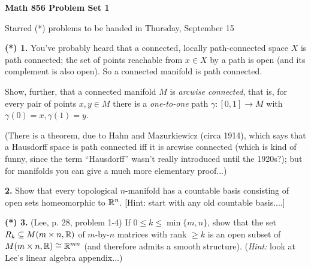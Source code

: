
\nopagenumbers


\loadmsbm

\def\ctln{\centerline}
\def\ssk{\smallskip}
\def\msk{\medskip}
\def\bsk{\bigskip}
\def\nidt{\noindent}
\def\del{\partial}
\def\bbr{{\Bbb R}}
\def\cla{{\Cal A}}
\def\clb{{\Cal B}}
\def\clc{{\Cal C}}



\ctln{\bf Math 856 Problem Set 1}

\ssk

\ctln{Starred (*) problems to be handed in Thursday, September 15}

\bsk

\item{\bf (*) 1.} You've probably heard that a connected, locally path-connected
space $X$ is path connected; the set of points reachable from $x\in X$ by a path is open
(and its complement is also open). So a connected manifold is path connected.

\ssk

\item{} Show, further, that a connected manifold $M$ is {\it arcwise connected},
that is, for every pair of points $x,y\in M$ there is a
{\it one-to-one} path $\gamma:[0,1]\rightarrow M$ with $\gamma(0)=x,\gamma(1)=y$.

\ssk

\item{} (There is a theorem, due to Hahn and Mazurkiewicz (circa 1914), which says 
that a Hausdorff space is path connected iff it is
arcwise connected (which is kind of funny, since the term ``Hausdorff''
wasn't really introduced until the 1920s?); but for manifolds you can 
give a much more elementary proof...)

\msk

\item{\bf 2.} Show that every topological $n$-manifold has a countable basis consisting of
open sets homeomorphic to $\bbr^n$. [Hint: start with any old countable basis....]

\msk

\item{\bf (*) 3.} (Lee, p. 28, problem 1-4) If $0\leq k\leq \min\{m,n\}$, show that the set 
$R_k\subseteq M(m\times n,{\Bbb R})$ of $m$-by-$n$ matrices 
with rank $\geq k$ is an open subset of $M(m\times n,{\Bbb R})
\cong {\Bbb R}^{mn}$ (and therefore admits a smooth structure).
({\it Hint:} look at Lee's linear algebra appendix...)

